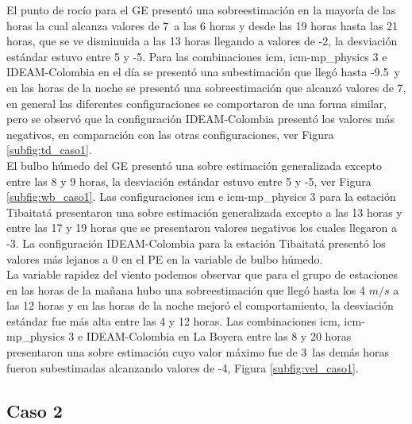 El punto de rocío para el GE presentó una sobreestimación en la mayoría de las horas la cual alcanza valores de 7\celc\ a las 6 horas y desde las 19 horas hasta las 21 horas, que se ve disminuida a las 13 horas llegando a valores de -2\celc, la desviación estándar estuvo entre 5 y -5. Para las combinaciones icm, icm-mp\_physics 3 e IDEAM-Colombia en el día se presentó una subestimación que llegó hasta -9.5\celc\ y en las horas de la noche se presentó una sobreestimación que alcanzó valores de 7\celc, en general las diferentes configuraciones se comportaron de una forma similar, pero se observó que la configuración IDEAM-Colombia presentó los valores más negativos, en comparación con las otras configuraciones, ver Figura \ref{subfig:td_caso1}.\\

El bulbo húmedo del GE presentó una sobre estimación generalizada excepto entre las 8 y 9 horas, la desviación estándar estuvo entre 5 y -5\celsius, ver Figura \ref{subfig:wb_caso1}. Las configuraciones icm e icm-mp\_physics 3 para la estación Tibaitatá presentaron una sobre estimación generalizada excepto a las 13 horas y entre las 17 y 19 horas que se presentaron valores negativos los cuales llegaron a -3\celc. La configuración IDEAM-Colombia para la estación Tibaitatá presentó los valores más lejanos a 0 en el PE en la variable de bulbo húmedo.\\

La variable rapidez del viento podemos observar que para el grupo de estaciones en las horas de la mañana hubo una sobreestimación que llegó hasta los 4 $m/s$ a las 12 horas y en las horas de la noche mejoró el comportamiento, la desviación estándar fue más alta entre las 4 y 12 horas. Las combinaciones icm, icm-mp\_physics 3 e IDEAM-Colombia en La Boyera entre las 8 y 20 horas presentaron una sobre estimación cuyo valor máximo fue de 3\celc\ las demás horas fueron subestimadas alcanzando valores de -4\celc, Figura \ref{subfig:vel_caso1}.\\


\subsection{Caso 2}

